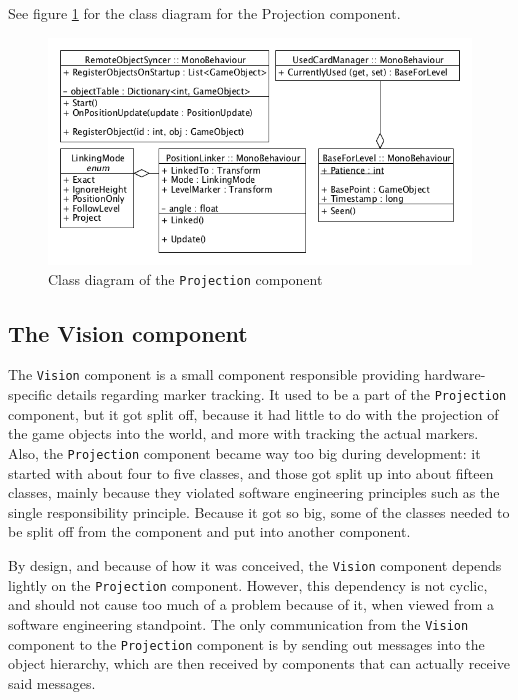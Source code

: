 			See figure \ref{fig:classdiagramprojection} for the class diagram for 
			the Projection component.
			
			\begin{figure}[ht]
				\includegraphics[width=\textwidth]{ClassDiagramProjection}
				\caption{Class diagram of the \texttt{Projection} component}
				\label{fig:classdiagramprojection}
			\end{figure}
			
		\subsection{The Vision component} \label{ssec:visioncomponent}
			The \texttt{Vision} component is a small component responsible 
            providing hardware-specific details regarding marker tracking. 
            It used to be a part of the \texttt{Projection} component, but 
            it got split off, because it had little to do with the projection 
            of the game objects into the world, and more with tracking the 
            actual markers. Also, the \texttt{Projection} component became way 
            too big during development: it started with about four to five 
            classes, and those got split up into about fifteen classes, mainly 
            because they violated software engineering principles such as the 
            single responsibility principle. Because it got so big, some of the 
            classes needed to be split off from the component and put into 
            another component.
			
			By design, and because of how it was conceived, the \texttt{Vision} 
			component depends lightly on the \texttt{Projection} component.
			However, this dependency is not cyclic, and should not cause too
			much of a problem because of it, when viewed from a software
			engineering standpoint. The only communication from the \texttt{Vision}
			component to the \texttt{Projection} component is by sending out
			messages into the object hierarchy, which are then received by 
			components that can actually receive said messages. 
			
